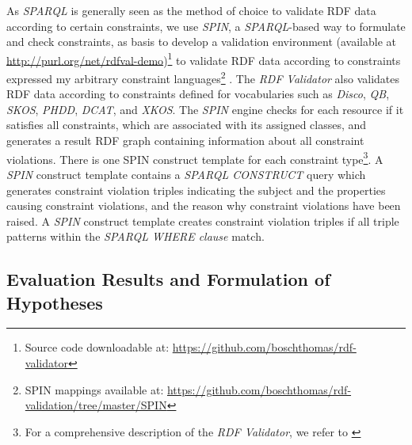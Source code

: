 \documentclass{llncs}
\begin{document}
As \emph{SPARQL} is generally seen as the method of choice to validate RDF data according to certain constraints,
we use \emph{SPIN}, 
a \emph{SPARQL}-based way to formulate and check constraints, as basis to develop a
validation environment (available at \url{http://purl.org/net/rdfval-demo})\footnote{Source code downloadable at: \url{https://github.com/boschthomas/rdf-validator}} to validate RDF data according to constraints expressed my arbitrary constraint languages\footnote{SPIN mappings available at: \url{https://github.com/boschthomas/rdf-validation/tree/master/SPIN}} \cite{BoschEckert2014-2}.
The \emph{RDF Validator} also validates RDF data according to constraints defined for vocabularies such as \emph{Disco}, \emph{QB}, \emph{SKOS}, \emph{PHDD}, \emph{DCAT}, and \emph{XKOS}.
The \emph{SPIN} engine checks for each resource if it satisfies all constraints, which are associated with its assigned classes, and generates a result RDF graph containing information about all constraint violations.
There is one SPIN construct template for each constraint type\footnote{For a comprehensive description of the \emph{RDF Validator}, we refer to \cite{BoschEckert2014-2}}.
A \emph{SPIN} construct template contains a \emph{SPARQL CONSTRUCT} query which generates constraint violation triples indicating the subject and the properties causing constraint violations, and the reason why constraint violations have been raised.
A \emph{SPIN} construct template creates constraint violation triples if all triple patterns within the \emph{SPARQL WHERE clause} match.

\subsection{Evaluation Results and Formulation of Hypotheses}

\end{document}
